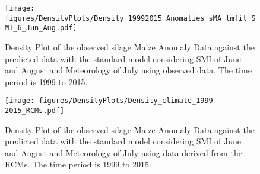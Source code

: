 \documentclass[12pt]{iopart}
\begin{document}
\begin{figure}
	\label{density:1f}
	\centering
	\texttt{[image: figures/DensityPlots/Density\_19992015\_Anomalies\_sMA\_lmfit\_SMI\_6\_Jun\_Aug.pdf]}
	\caption{Density Plot of the observed silage Maize Anomaly Data against the predicted data with the standard model considering SMI of June and August and
		Meteorology of July using observed data. The time period is 1999 to 2015.}
\end{figure}




\begin{figure}
	\label{density:2f}
	\centering
	\texttt{[image: figures/DensityPlots/Density\_climate\_1999-2015\_RCMs.pdf]}
	\caption{Density Plot of the observed silage Maize Anomaly Data against the predicted data with the standard model considering SMI of June and August and
		Meteorology of July using data derived from the RCMs. The time period is 1999 to 2015.}
\end{figure}


\end{document}
